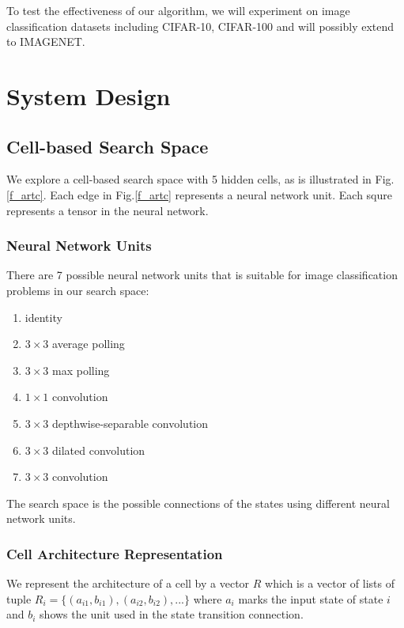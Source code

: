 \documentclass[conference]{IEEEtran}
\begin{document}
    To test the effectiveness of our algorithm, we will experiment on image classification datasets including CIFAR-10, CIFAR-100 and will possibly extend to IMAGENET.


  \section{System Design}
  \subsection{Cell-based Search Space}

  We explore a cell-based search space with 5 hidden cells, as is illustrated in Fig.\ref{f_artc}. Each edge in Fig.\ref{f_artc} represents a neural network unit. Each squre represents a tensor in the neural network.

  \subsubsection{Neural Network Units}
  
  There are 7 possible neural network units that is suitable for image classification problems in our search space:

      \begin{enumerate}
        \item identity
        \item $3\times3$ average polling
        \item $3\times3$ max polling
        \item $1\times1$ convolution
        \item $3\times3$ depthwise-separable convolution
        \item $3\times3$ dilated convolution
        \item $3\times3$ convolution
      \end{enumerate}

  The search space is the possible connections of the states using different neural network units.

  \subsubsection{Cell Architecture Representation}

  We represent the architecture of a cell by a vector $R$ which is a vector of lists of tuple $R_{i} = \{(a_{i1}, b_{i1}), (a_{i2}, b_{i2}), ...\}$ where $a_i$ marks the input state of state $i$ and $b_i$ shows the unit used in the state transition connection.
\end{document}
